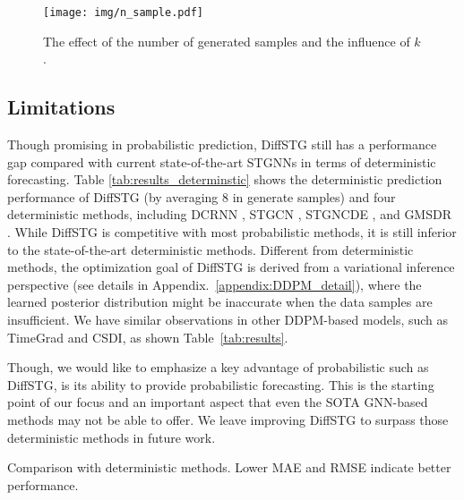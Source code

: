 {\begin{figure}[!t]
    \centering
    \texttt{[image: img/n\_sample.pdf]} 
    \vspace{-1em}
    \caption{The effect of the number of generated samples and the influence of $k$.}
    \label{fig:n_sample_and_k}
\end{figure}

\subsection{Limitations}
\par Though promising in probabilistic prediction, DiffSTG still has a performance gap compared with current state-of-the-art STGNNs in terms of deterministic forecasting. Table \ref{tab:results_determinstic} shows the deterministic prediction performance of DiffSTG (by averaging 8 in generate samples) and four deterministic methods, including DCRNN \cite{li2018diffusion}, STGCN \cite{STGCN-2018},  STGNCDE \cite{choi2022graph}, and GMSDR \cite{liu2022msdr}. While DiffSTG is competitive with most probabilistic methods, it is still inferior to the state-of-the-art deterministic methods. Different from deterministic methods, the optimization goal of DiffSTG is derived from a variational inference perspective (see details in Appendix.~\ref{appendix:DDPM_detail}), where the learned posterior distribution might be inaccurate when the data samples are insufficient. We have similar observations in other DDPM-based models, such as TimeGrad and CSDI, as shown Table~\ref{tab:results}. 
\par Though, we would like to emphasize a key advantage of probabilistic such as DiffSTG, is its ability to provide probabilistic forecasting. This is the starting point of our focus and an important aspect that even the SOTA GNN-based methods may not be able to offer. We leave improving DiffSTG to surpass those deterministic methods in future work.

\begin{table}[htbp]

\centering
\small
\caption{Comparison with deterministic methods. Lower MAE and RMSE indicate better performance.}
\setlength\tabcolsep{6 pt}


\end{table}}
